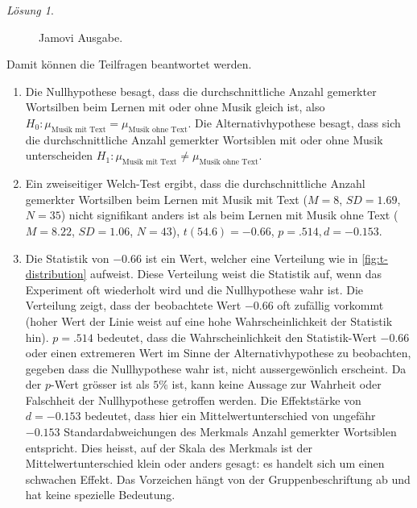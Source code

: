 \documentclass[
]{book}
\providecommand{\tightlist}{%
  \setlength{\itemsep}{0pt}\setlength{\parskip}{0pt}}
\theoremstyle{definition}
\theoremstyle{definition}
\theoremstyle{definition}
\theoremstyle{definition}
\theoremstyle{remark}
\newtheorem*{solution}{Lösung}
\begin{document}
\begin{solution}
\begin{figure}
{}

\caption{Jamovi Ausgabe.}\label{fig:sol-music-memory-output}
\end{figure}

Damit können die Teilfragen beantwortet werden.

\begin{enumerate}
\def\labelenumi{\alph{enumi})}
\tightlist
\item
  Die Nullhypothese besagt, dass die durchschnittliche Anzahl gemerkter Wortsilben beim Lernen mit oder ohne Musik gleich ist, also \(H_0: \mu_\text{Musik mit Text} = \mu_\text{Musik ohne Text}\). Die Alternativhypothese besagt, dass sich die durchschnittliche Anzahl gemerkter Wortsiblen mit oder ohne Musik unterscheiden \(H_1: \mu_\text{Musik mit Text} \neq \mu_\text{Musik ohne Text}\).
\item
  Ein zweiseitiger Welch-Test ergibt, dass die durchschnittliche Anzahl gemerkter Wortsilben beim Lernen mit Musik mit Text (\(M = 8\), \(SD = 1.69\), \(N = 35\)) nicht signifikant anders ist als beim Lernen mit Musik ohne Text (\(M = 8.22\), \(SD = 1.06\), \(N = 43\)), \(t(54.6) = -0.66\), \(p = .514, d = -0.153\).
\item
  Die Statistik von \(-0.66\) ist ein Wert, welcher eine Verteilung wie in \ref{fig:t-distribution} aufweist. Diese Verteilung weist die Statistik auf, wenn das Experiment oft wiederholt wird und die Nullhypothese wahr ist. Die Verteilung zeigt, dass der beobachtete Wert \(-0.66\) oft zufällig vorkommt (hoher Wert der Linie weist auf eine hohe Wahrscheinlichkeit der Statistik hin). \(p = .514\) bedeutet, dass die Wahrscheinlichkeit den Statistik-Wert \(-0.66\) oder einen extremeren Wert im Sinne der Alternativhypothese zu beobachten, gegeben dass die Nullhypothese wahr ist, nicht aussergewönlich erscheint. Da der \(p\)-Wert grösser ist als \(5\%\) ist, kann keine Aussage zur Wahrheit oder Falschheit der Nullhypothese getroffen werden. Die Effektstärke von \(d = -0.153\) bedeutet, dass hier ein Mittelwertunterschied von ungefähr \(-0.153\) Standardabweichungen des Merkmals Anzahl gemerkter Wortsiblen entspricht. Dies heisst, auf der Skala des Merkmals ist der Mittelwertunterschied klein oder anders gesagt: es handelt sich um einen schwachen Effekt. Das Vorzeichen hängt von der Gruppenbeschriftung ab und hat keine spezielle Bedeutung.
\end{enumerate}

\end{solution}
\end{document}
